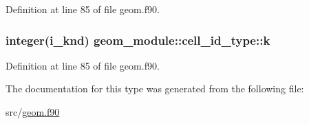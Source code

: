 Definition at line 85 of file geom.\-f90.

\hypertarget{structgeom__module_1_1cell__id__type_a36bd9730e34c4ed402a52da97e467010}{
\subsubsection[{k}]{\setlength{\rightskip}{0pt plus 5cm}integer(i\-\_\-knd) geom\-\_\-module\-::cell\-\_\-id\-\_\-type\-::k}}\label{structgeom__module_1_1cell__id__type_a36bd9730e34c4ed402a52da97e467010}


Definition at line 85 of file geom.\-f90.



The documentation for this type was generated from the following file\-:\begin{DoxyCompactItemize}
\item 
src/\hyperlink{geom_8f90}{geom.\-f90}\end{DoxyCompactItemize}
